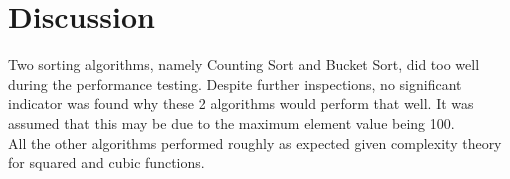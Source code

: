\chapter{Discussion}

Two sorting algorithms, namely Counting Sort and Bucket Sort, did too well during the performance testing.
Despite further inspections, no significant indicator was found why these 2 algorithms would perform that well. It was assumed that this may be due to the maximum element value being 100.\\
All the other algorithms performed roughly as expected given complexity theory for squared and cubic functions.
